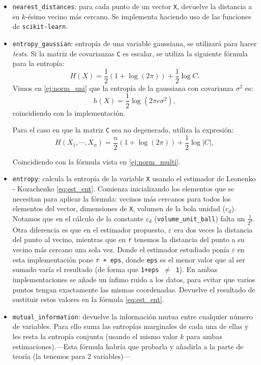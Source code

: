 \documentclass[10pt,a4paper]{article} %
\theoremstyle{definition}
\begin{document}
\begin{itemize}
\item \texttt{nearest\_distances}: para cada punto de un vector \texttt{X}, devuelve la distancia a su $k$-ésimo vecino más cercano. Se implementa haciendo uso de las funciones de \texttt{scikit-learn}.

\item \texttt{entropy\_gaussian}: entropía de una variable gaussiana, se utilizará para hacer \textit{tests}. Si la matriz de covarianzas \texttt{C} es escalar, se utiliza la siguiente fórmula para la entropía:\[
  H(X) = \frac{1}{2}\left ( 1 + \log(2\pi) \right )+ \frac{1}{2} \log C.
  \]
Vimos en \ref{ej:norm_uni} que la entropía de la gaussiana con covarianza $\sigma^2$ es:\[
h(X) = \frac{1}{2}\log (2\pi e \sigma^2 ),
\]
coincidiendo con la implementación.

Para el caso en que la matriz \texttt{C} sea no degenerada, utiliza la expresión:\[
H(X_1,\cdots, X_n) = \frac{n}{2} \left (1 + \log(2\pi) \right) + \frac{1}{2}\log |C|,
\]

Coincidiendo con la fórmula vista en \ref{ej:norm_multi}.

\item \texttt{entropy}: calcula la entropía de la variable \texttt{X} usando el estimador de Leonenko - Kozachenko \ref{eq:est_ent}. Comienza inicializando los elementos que se necesitan para aplicar la fórmula: vecinos más cercanos para todos los elementos del vector, dimensiones de \texttt{X}, volumen de la bola unidad ($c_d$). Notamos que en el cálculo de la constante $c_d$ (\texttt{volume\_unit\_ball}) falta un $\frac{1}{2^d}$. Otra diferencia es que en el estimador propuesto, $\varepsilon$ era dos veces la distancia del punto al vecino, mientras que en \texttt{r} tenemos la distancia del punto a su vecino más cercano una sola vez. Donde el estimador estudiado ponía $\varepsilon$ en esta implementación pone \texttt{r + eps}, donde \texttt{eps} es el menor valor que al ser sumado varía el resultado (de forma que  \texttt{1+eps $\neq$ 1}). En ambas implementaciones se añade un ínfimo ruido a los datos, para evitar que varios puntos tengan exactamente las mismas coordenadas. Devuelve el resultado de sustituir estos valores en la fórmula \ref{eq:est_ent}.

\item \texttt{mutual\_information}: devuelve la información mutua entre cualquier número de variables. Para ello suma las entropías marginales de cada una de ellas y les resta la entropía conjunta (usando el mismo valor $k$ para ambas estimaciones).---Esta fórmula habría que probarla y añadirla a la parte de teoría (la tenemos para 2 variables)--- %


\end{itemize}
\end{document}
